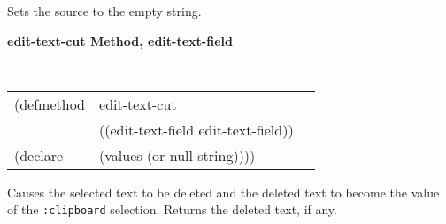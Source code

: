 \begin{flushright} \parbox[t]{6.125in}{
Sets the source to the empty string.}
\end{flushright}

{\samepage
{\large {\bf edit-text-cut \hfill Method, edit-text-field}}
\begin{flushright} \parbox[t]{6.125in}{
\tt
\begin{tabular}{lll}
\raggedright
(defmethod & edit-text-cut & \\
           & ((edit-text-field  edit-text-field)) \\
(declare   & (values (or null string))))
\end{tabular}
\rm

}\end{flushright}}

\begin{flushright} \parbox[t]{6.125in}{
Causes the selected text to be deleted and the deleted text to become the value
of the {\tt :clipboard} selection.
Returns the deleted text, if any.

}\end{flushright}



%
%
%


